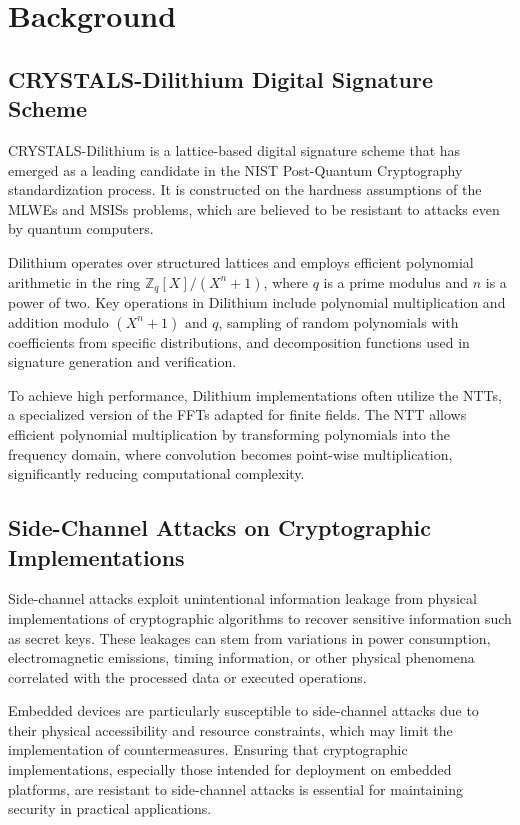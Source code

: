 \chapter{Background}
\thispagestyle{chapterstart}

\section{CRYSTALS-Dilithium Digital Signature Scheme}

CRYSTALS-Dilithium is a lattice-based digital signature scheme that has emerged as a leading candidate in the \ac{NIST} Post-Quantum Cryptography standardization process. It is constructed on the hardness assumptions of the \acp{MLWE} and \acp{MSIS} problems, which are believed to be resistant to attacks even by quantum computers.

Dilithium operates over structured lattices and employs efficient polynomial arithmetic in the ring $\mathbb{Z}_q[X]/(X^n + 1)$, where $q$ is a prime modulus and $n$ is a power of two. Key operations in Dilithium include polynomial multiplication and addition modulo $(X^n + 1)$ and $q$, sampling of random polynomials with coefficients from specific distributions, and decomposition functions used in signature generation and verification.

To achieve high performance, Dilithium implementations often utilize the \acp{NTT}, a specialized version of the \acp{FFT} adapted for finite fields. The NTT allows efficient polynomial multiplication by transforming polynomials into the frequency domain, where convolution becomes point-wise multiplication, significantly reducing computational complexity.

\section{Side-Channel Attacks on Cryptographic Implementations}

Side-channel attacks exploit unintentional information leakage from physical implementations of cryptographic algorithms to recover sensitive information such as secret keys. These leakages can stem from variations in power consumption, electromagnetic emissions, timing information, or other physical phenomena correlated with the processed data or executed operations.

Embedded devices are particularly susceptible to side-channel attacks due to their physical accessibility and resource constraints, which may limit the implementation of countermeasures. Ensuring that cryptographic implementations, especially those intended for deployment on embedded platforms, are resistant to side-channel attacks is essential for maintaining security in practical applications.

